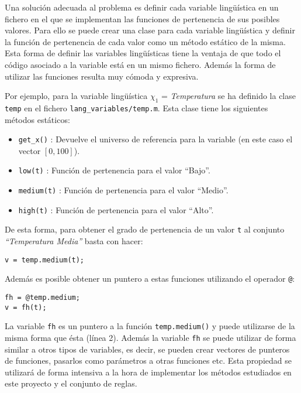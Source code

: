 Una solución adecuada al problema es definir cada variable lingüística en un fichero en el que se implementan las funciones de pertenencia de sus posibles valores. Para ello se puede crear una clase para cada variable lingüística y definir la función de pertenencia de cada valor como un método estático de la misma. Esta forma de definir las variables lingüísticas tiene la ventaja de que todo el código asociado a la variable está en un mismo fichero. Además la forma de utilizar las funciones resulta muy cómoda y expresiva.

Por ejemplo, para la variable lingüística $\chi_1$ = \emph{Temperatura} se ha definido la clase \lstinline|temp| en el fichero \lstinline|lang_variables/temp.m|. Esta clase tiene los siguientes métodos estáticos:
\begin{itemize}
\item \lstinline|get_x()| : Devuelve el universo de referencia para la variable (en este caso el vector $[0,100]$).
\item \lstinline|low(t)| : Función de pertenencia para el valor ``Bajo''.
\item \lstinline|medium(t)| : Función de pertenencia para el valor ``Medio''.
\item \lstinline|high(t)| : Función de pertenencia para el valor ``Alto''.
\end{itemize}

De esta forma, para obtener el grado de pertenencia de un valor \lstinline|t| al conjunto \emph{``Temperatura Media''} basta con hacer:

\begin{lstlisting}
v = temp.medium(t);
\end{lstlisting}

Además es posible obtener un puntero a estas funciones utilizando el operador \lstinline|@|:

\begin{lstlisting}
fh = @temp.medium;
v = fh(t);
\end{lstlisting}

La variable \lstinline|fh| es un puntero a la función \lstinline|temp.medium()| y puede utilizarse de la misma forma que ésta (línea 2). Además la variable \lstinline|fh| se puede utilizar de forma similar a otros tipos de variables, es decir, se pueden crear vectores de punteros de funciones, pasarlos como parámetros a otras funciones etc. Esta propiedad se utilizará de forma intensiva a la hora de implementar los métodos estudiados en este proyecto y el conjunto de reglas.

